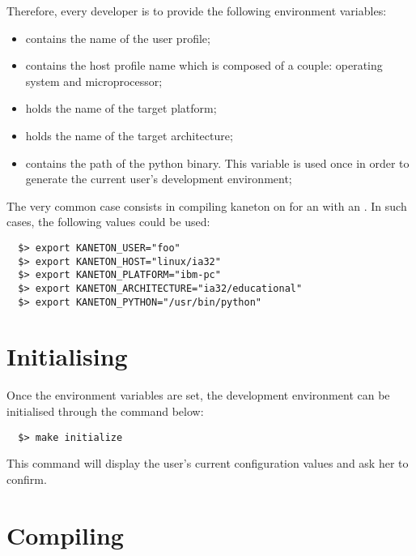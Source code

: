 Therefore, every developer is to provide the following  environment
variables:

\begin{itemize}
  \item
     contains the name of the user profile;
  \item
     contains the host profile name which is
    composed of a couple: operating system and microprocessor;
  \item
     holds the name of the target platform;
  \item
     holds the name of the target
    architecture;
  \item
     contains the path of the python binary. This
    variable is used once in order to generate the current user's development
    environment;
\end{itemize}

The very common case consists in compiling kaneton on for an 
with an . In such cases, the following values
could be used:

\begin{verbatim}
  $> export KANETON_USER="foo"
  $> export KANETON_HOST="linux/ia32"
  $> export KANETON_PLATFORM="ibm-pc"
  $> export KANETON_ARCHITECTURE="ia32/educational"
  $> export KANETON_PYTHON="/usr/bin/python"
\end{verbatim}

%
%

\section{Initialising}

Once the  environment variables are set, the development environment
can be initialised through the command below:

\begin{verbatim}
  $> make initialize
\end{verbatim}

This command will display the user's current configuration values and ask
her to confirm.

%
%

\section{Compiling}

